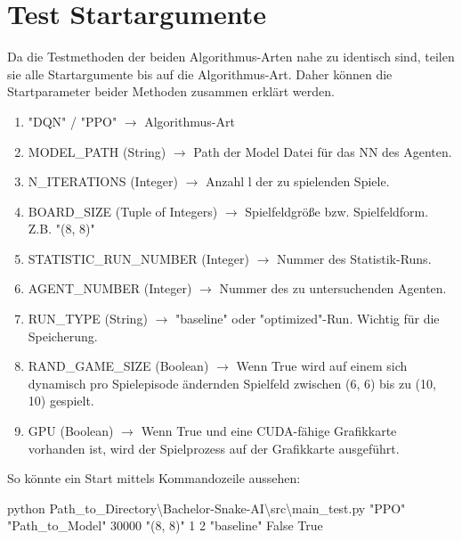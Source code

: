 \section{Test Startargumente} \label{sec:Anleitung_Test_Startargumente}
Da die Testmethoden der beiden Algorithmus-Arten nahe zu identisch sind, teilen sie alle Startargumente bis auf die Algorithmus-Art. Daher können die Startparameter beider Methoden zusammen erklärt werden.
\begin{enumerate}
	\item "DQN" / "PPO" $\longrightarrow$ Algorithmus-Art	
	\item MODEL\_PATH (String) $\longrightarrow$ Path der Model Datei für das NN des Agenten.
	\item N\_ITERATIONS (Integer) $\longrightarrow$ Anzahl l der zu spielenden Spiele.
	\item BOARD\_SIZE (Tuple of Integers) $\longrightarrow$ Spielfeldgröße bzw. Spielfeldform. Z.B. "(8, 8)"
	\item STATISTIC\_RUN\_NUMBER (Integer) $\longrightarrow$ Nummer des Statistik-Runs.
	\item AGENT\_NUMBER (Integer) $\longrightarrow$ Nummer des zu untersuchenden Agenten.
	\item RUN\_TYPE (String) $\longrightarrow$ "baseline" oder "optimized"-Run. Wichtig für die Speicherung.
	\item RAND\_GAME\_SIZE (Boolean) $\longrightarrow$ Wenn True wird auf einem sich dynamisch pro Spielepisode ändernden Spielfeld zwischen (6, 6) bis zu (10, 10) gespielt.
	\item GPU (Boolean) $\longrightarrow$ Wenn True und eine CUDA-fähige Grafikkarte vorhanden ist, wird der Spielprozess auf der Grafikkarte ausgeführt.
\end{enumerate}
So könnte ein Start mittels Kommandozeile aussehen:
\begin{center}
	python Path\_to\_Directory\textbackslash Bachelor-Snake-AI\textbackslash src\textbackslash main\_test.py "PPO"{} "Path\_to\_Model"{} 30000 "(8, 8)"{} 1 2 "baseline"{} False True
\end{center}